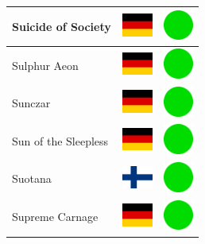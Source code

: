 \documentclass[12pt, a4paper, twoside]{report}
\begin{document}
\begin{center}
\begin{longtable}{|p{5cm}|p{2cm}|p{2cm}|}
 Suicide of Society                                         & \includegraphics[width=1cm]{../img/flags/de} &   \includegraphics[width=1cm]{../likes/y} \\ \hline
 Sulphur Aeon                                               & \includegraphics[width=1cm]{../img/flags/de} &   \includegraphics[width=1cm]{../likes/y} \\ \hline
 Sunczar                                                    & \includegraphics[width=1cm]{../img/flags/de} &   \includegraphics[width=1cm]{../likes/y} \\ \hline
 Sun of the Sleepless                                       & \includegraphics[width=1cm]{../img/flags/de} &   \includegraphics[width=1cm]{../likes/y} \\ \hline
 Suotana                                                    & \includegraphics[width=1cm]{../img/flags/fi} &   \includegraphics[width=1cm]{../likes/y} \\ \hline
 Supreme Carnage                                            & \includegraphics[width=1cm]{../img/flags/de} &   \includegraphics[width=1cm]{../likes/y} \\ \hline

\end{longtable}
\end{center}
\end{document}
